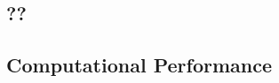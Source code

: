 \documentclass[%
 reprint,
 amsmath,amssymb,
 aps,nofootinbib
]{revtex4-1}
\begin{document}
%

%


\subsection{??}



\subsection{Computational Performance}
\end{document}
